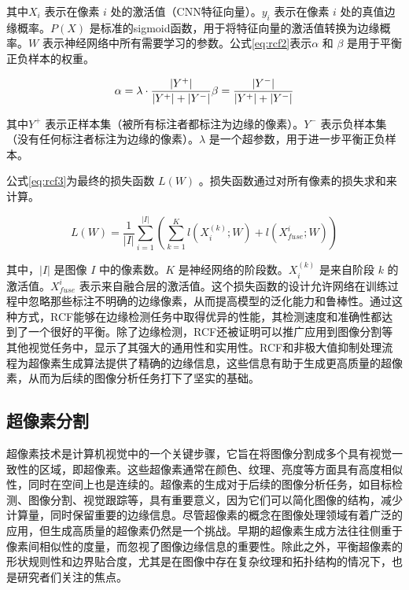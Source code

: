 其中\( X_i \) 表示在像素 \( i \) 处的激活值（CNN特征向量）。\( y_i \) 表示在像素 \( i \) 处的真值边缘概率。\( P(X) \) 是标准的sigmoid函数，用于将特征向量的激活值转换为边缘概率。\( W \) 表示神经网络中所有需要学习的参数。公式\eqref{eq:rcf2}表示\( \alpha \) 和 \( \beta \) 是用于平衡正负样本的权重。

\begin{equation}
  \alpha = \lambda \cdot \frac{|Y^+|}{|Y^+| + |Y^-|} \\\\
  \beta = \frac{|Y^-|}{|Y^+| + |Y^-|}
  \label{eq:rcf2}
\end{equation}

其中\( Y^+ \) 表示正样本集（被所有标注者都标注为边缘的像素）。\( Y^- \) 表示负样本集（没有任何标注者标注为边缘的像素）。\( \lambda \) 是一个超参数，用于进一步平衡正负样本。

公式\eqref{eq:rcf3}为最终的损失函数 \( L(W) \) 。损失函数通过对所有像素的损失求和来计算。

\begin{equation}
  L(W) = \frac{1}{|I|} \sum_{i=1}^{|I|} \left( \sum_{k=1}^{K} l(X^{(k)}_i; W) + l(X_{fuse}^i; W) \right)
  \label{eq:rcf3}
\end{equation}

其中，\( |I| \) 是图像 \( I \) 中的像素数。\( K \) 是神经网络的阶段数。\( X^{(k)}_i \) 是来自阶段 \( k \) 的激活值。\( X_{fuse}^i \) 表示来自融合层的激活值。这个损失函数的设计允许网络在训练过程中忽略那些标注不明确的边缘像素，从而提高模型的泛化能力和鲁棒性。通过这种方式，RCF能够在边缘检测任务中取得优异的性能，其检测速度和准确性都达到了一个很好的平衡。除了边缘检测，RCF还被证明可以推广应用到图像分割等其他视觉任务中，显示了其强大的通用性和实用性。RCF和非极大值抑制处理流程为超像素生成算法提供了精确的边缘信息，这些信息有助于生成更高质量的超像素，从而为后续的图像分析任务打下了坚实的基础。

\subsection{超像素分割}

超像素技术是计算机视觉中的一个关键步骤，它旨在将图像分割成多个具有视觉一致性的区域，即超像素。这些超像素通常在颜色、纹理、亮度等方面具有高度相似性，同时在空间上也是连续的。超像素的生成对于后续的图像分析任务，如目标检测、图像分割、视觉跟踪等，具有重要意义，因为它们可以简化图像的结构，减少计算量，同时保留重要的边缘信息。尽管超像素的概念在图像处理领域有着广泛的应用，但生成高质量的超像素仍然是一个挑战。早期的超像素生成方法往往侧重于像素间相似性的度量，而忽视了图像边缘信息的重要性。除此之外，平衡超像素的形状规则性和边界贴合度，尤其是在图像中存在复杂纹理和拓扑结构的情况下，也是研究者们关注的焦点。

